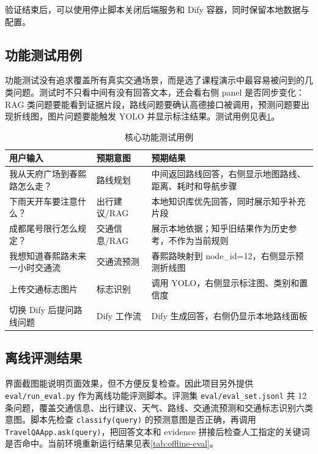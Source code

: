 \documentclass[bwprint]{report}
\begin{document}
验证结束后，可以使用停止脚本关闭后端服务和 Dify 容器，同时保留本地数据与配置。

\subsection{功能测试用例}
功能测试没有追求覆盖所有真实交通场景，而是选了课程演示中最容易被问到的几类问题。测试时不只看中间有没有回答文本，还会看右侧 panel 是否同步变化：RAG 类问题要能看到证据片段，路线问题要确认高德接口被调用，预测问题要出现折线图，图片问题要能触发 YOLO 并显示标注结果。测试用例见表\ref{tab:test-cases}。

\begin{table}[H]
    \caption{核心功能测试用例}
    \label{tab:test-cases}
    \centering
    \small
    \begin{tabular}{p{}p{}p{}}
        \toprule[1.5pt]
        用户输入 & 预期意图 & 预期结果 \\
        \midrule[1pt]
        我从天府广场到春熙路怎么走？ & 路线规划 & 中间返回路线回答，右侧显示地图路线、距离、耗时和导航步骤 \\
        下雨天开车要注意什么？ & 出行建议/RAG & 本地知识库优先回答，同时展示知乎补充片段 \\
        成都尾号限行怎么规定？ & 交通信息/RAG & 展示本地依据；知乎旧结果作为历史参考，不作为当前规则 \\
        我想知道春熙路未来一小时交通流 & 交通流预测 & 春熙路映射到 node\_id=12，右侧显示预测折线图 \\
        上传交通标志图片 & 标志识别 & 调用 YOLO，右侧显示标注图、类别和置信度 \\
        切换 Dify 后提问路线问题 & Dify 工作流 & Dify 生成回答，右侧仍显示本地路线面板 \\
        \bottomrule[1.5pt]
    \end{tabular}
\end{table}

\subsection{离线评测结果}
界面截图能说明页面效果，但不方便反复检查。因此项目另外提供 \texttt{eval/run\_eval.py} 作为离线功能评测脚本。评测集 \texttt{eval/eval\_set.jsonl} 共 12 条问题，覆盖交通信息、出行建议、天气、路线、交通流预测和交通标志识别六类意图。脚本先检查 \texttt{classify(query)} 的预测意图是否正确，再调用 \texttt{TravelQAApp.ask(query)}，把回答文本和 evidence 拼接后检查人工指定的关键词是否命中。当前环境重新运行结果见表\ref{tab:offline-eval}。
\end{document}
